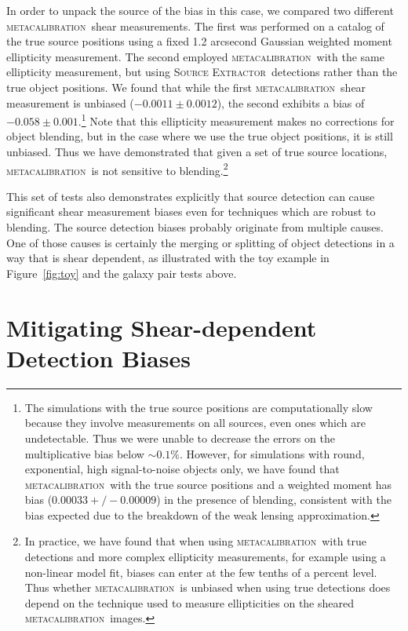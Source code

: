 \documentclass[iop, appendixfloats, numberedappendix, apj]{emulateapj}
\newcommand{\mcal}{\textsc{metacalibration}}
\newcommand{\sx}{\textsc{Source Extractor}}
\begin{document}
In order to unpack the source of the bias in this case, we compared two
different \mcal\ shear measurements. The first was performed on a catalog of the true
source positions using a fixed 1.2 arcsecond Gaussian weighted moment
ellipticity measurement. The second employed \mcal\ with the same ellipticity
measurement, but using \sx\ detections rather than the true object positions. We
found that while the first \mcal\ shear measurement is unbiased
($-0.0011\pm0.0012$), the second exhibits a bias of
$-0.058\pm0.001$.\footnote{The simulations with the true source positions are
computationally slow because they involve measurements on all sources, even
ones which are undetectable. Thus we were unable to decrease the errors on the
multiplicative bias below $\sim0.1\%$. However, for simulations with round,
exponential, high signal-to-noise objects only, we have found that \mcal\ with
the true source positions and a weighted moment has bias ($0.00033 +/-
0.00009$) in the presence of blending, consistent with the bias expected due to
the breakdown of the weak lensing approximation.} Note that this ellipticity
measurement makes no corrections for object blending, but in the case where we
use the true object positions, it is still unbiased. Thus we have demonstrated
that given a set of true source locations, \mcal\ is not sensitive to
blending.\footnote{In practice, we have found that when using \mcal\ with true
detections and more complex ellipticity measurements, for example using a
non-linear model fit, biases can enter at the few tenths of a percent level.
Thus whether \mcal\ is unbiased when using true detections does depend on the
technique used to measure ellipticities on the sheared \mcal\ images.}

This set of tests also demonstrates explicitly that source detection can cause
significant shear measurement biases even for techniques which are robust to
blending. The source detection biases probably originate from multiple causes.
One of those causes is certainly the merging or splitting of object detections
in a way that is shear dependent, as illustrated with the toy example in
Figure~\ref{fig:toy} and the galaxy pair tests above.

\newpage
\section{Mitigating Shear-dependent Detection Biases} \label{sec:mitigate}
\end{document}
